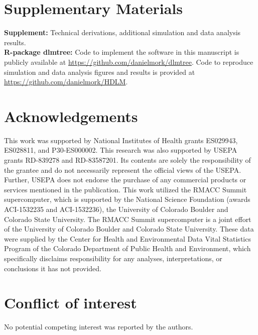 \documentclass[12pt]{article}
\begin{document}
\section*{Supplementary Materials}
\textbf{Supplement:} Technical derivations, additional simulation and data analysis results.\\
\textbf{R-package dlmtree:} Code to implement the software in this manuscript is publicly available at \url{https://github.com/danielmork/dlmtree}. Code to reproduce simulation and data analysis figures and results is provided at \url{https://github.com/danielmork/HDLM}.


\section*{Acknowledgements}
This work was supported by National Institutes of Health grants ES029943, ES028811, and P30-ES000002. This research was also supported by USEPA grants RD-839278 and RD-83587201. Its contents are solely the responsibility of the grantee and do not necessarily represent the official views of the USEPA. Further, USEPA does not endorse the purchase of any commercial products or services mentioned in the publication. This work utilized the RMACC Summit supercomputer, which is supported by the National Science Foundation (awards ACI-1532235 and ACI-1532236), the University of Colorado Boulder and Colorado State University. The RMACC Summit supercomputer is a joint effort of the University of Colorado Boulder and Colorado State University. These data were supplied by the Center for Health and Environmental Data Vital Statistics Program of the Colorado Department of Public Health and Environment, which specifically disclaims responsibility for any analyses, interpretations, or conclusions it has not provided.

\section*{Conflict of interest}
No potential competing interest was reported by the authors.


\end{document}
